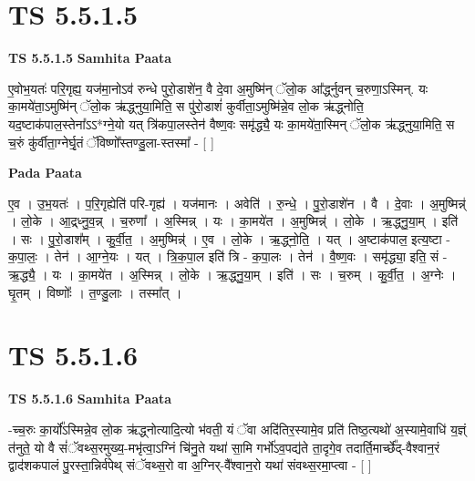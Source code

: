 \documentclass[17pt]{extarticle}
\begin{document}
\section*{ TS 5.5.1.5 }

\textbf{TS 5.5.1.5 } \newline
\textbf{Samhita Paata} \newline

ए॒वोभ॒यतः॑ परि॒गृह्य॒ यज॑मा॒नोऽव॑ रुन्धे पुरो॒डाशे॑न॒ वै दे॒वा अ॒मुष्मि॑न् ॅलो॒क आ᳚र्द्ध्नुवन् च॒रुणा॒ऽस्मिन्. यः का॒मये॑ता॒ऽमुष्मि॑न् ॅलो॒क ऋ॑द्ध्नुया॒मिति॒ स पु॑रो॒डाशं॑ कुर्वीता॒ऽमुष्मि॑न्ने॒व लो॒क ऋ॑द्ध्नोति॒ यद॒ष्टाक॑पाल॒स्तेना᳚ऽऽ*ग्ने॒यो यत् त्रि॑कपा॒लस्तेन॑ वैष्ण॒वः समृ॑द्ध्यै॒ यः का॒मये॑ता॒स्मिन् ॅलो॒क ऋ॑द्ध्नुया॒मिति॒ स च॒रुं कु॑र्वीता॒ग्नेर्घृ॒तं ॅविष्णो᳚स्तण्डु॒ला-स्तस्मा᳚ - [  ] \newline

\textbf{Pada Paata} \newline

ए॒व । उ॒भ॒यतः॑ । प॒रि॒गृह्येति॑ परि-गृह्य॑ । यज॑मानः । अवेति॑ । रु॒न्धे॒ । पु॒रो॒डाशे॑न । वै । दे॒वाः । अ॒मुष्मिन्न्॑ । लो॒के । आ॒द्र्ध्नु॒व॒न्न् । च॒रुणा᳚ । अ॒स्मिन्न् । यः । का॒मये॑त । अ॒मुष्मिन्न्॑ । लो॒के । ऋ॒द्ध्नु॒या॒म् । इति॑ । सः । पु॒रो॒डाश᳚म् । कु॒र्वी॒त॒ । अ॒मुष्मिन्न्॑ । ए॒व । लो॒के । ऋ॒द्ध्नो॒ति॒ । यत् । अ॒ष्टाक॑पाल॒ इत्य॒ष्टा - क॒पा॒लः॒ । तेन॑ । आ॒ग्ने॒यः । यत् । त्रि॒क॒पा॒ल इति॑ त्रि - क॒पा॒लः । तेन॑ । वै॒ष्ण॒वः । समृ॑द्ध्या॒ इति॒ सं - ऋ॒द्ध्यै॒ । यः । का॒मये॑त । अ॒स्मिन्न् । लो॒के । ऋ॒द्ध्नु॒या॒म् । इति॑ । सः । च॒रुम् । कु॒र्वी॒त॒ । अ॒ग्नेः । घृ॒तम् । विष्णोः᳚ । त॒ण्डु॒लाः । तस्मा᳚त् ।  \newline




\section*{ TS 5.5.1.6 }

\textbf{TS 5.5.1.6 } \newline
\textbf{Samhita Paata} \newline

-च्च॒रुः का॒र्यो᳚ऽस्मिन्ने॒व लो॒क ऋ॑द्ध्नोत्यादि॒त्यो भ॑वती॒ यं ॅवा अदि॑तिर॒स्यामे॒व प्रति॑ तिष्ठ॒त्यथो॑ अ॒स्यामे॒वाधि॑ य॒ज्ञ्ं त॑नुते॒ यो वै सं॑ॅवथ्स॒रमुख्य॒-मभृ॑त्वा॒ऽग्निं चि॑नु॒ते यथा॑ सा॒मि गर्भो॑ऽव॒पद्य॑ते ता॒दृगे॒व तदार्ति॒मार्च्छे᳚द्-वैश्वान॒रं द्वाद॑शकपालं पु॒रस्ता॒न्निर्व॑पेथ् संॅवथ्स॒रो वा अ॒ग्निर्-वै᳚श्वान॒रो यथा॑ संवथ्स॒रमा॒प्त्वा - [  ] \newline
\end{document}
